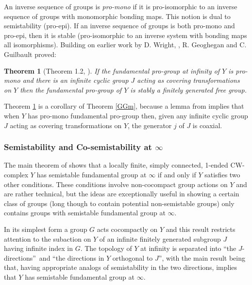 \documentclass[12pt]{article}
\newtheorem{theorem}{Theorem}[subsection]
\begin{document}
An inverse sequence of groups is {\it pro-mono} if it is pro-isomorphic to an inverse sequence of groups with monomorphic bonding maps. This notion is dual to semistability (pro-epi).  If an inverse sequence of groups is both pro-mono and pro-epi, then it is stable (pro-isomorphic to an inverse system with bonding maps all isomorphisms). 
Building on earlier work by D. Wright, \cite{W92}, R. Geoghegan and C. Guilbault \cite{GG12} proved:

\begin{theorem} [Theorem 1.2, \cite{GG12}] \label{Gg12} 
If the fundamental pro-group at infinity of $Y$ is pro-mono and there is an infinite cyclic group $J$ acting as covering transformations on $Y$ then the fundamental pro-group of $Y$ is stably a finitely generated free group.
\end{theorem}

Theorem \ref{Gg12} is a corollary of Theorem \ref{GGm}, because a lemma from \cite{W92} implies that when $Y$ has pro-mono fundamental pro-group then, given any infinite cyclic group $J$ acting as covering transformations on $Y$, the generator $j$ of $J$ is coaxial. 


\subsubsection {Semistability and Co-semistability at $\infty$}\label{SCS} 

The main theorem of \cite{GGM1} shows that a locally finite, simply connected, 1-ended  CW-complex $Y$ has semistable fundamental group at $\infty$ if and only if $Y$ satisfies two other conditions. These conditions involve non-cocompact group actions on $Y$ and are rather technical, but the ideas are exceptionally useful in showing a certain class of groups (long though to contain potential non-semistable groups) only contains groups with semistable fundamental group at $\infty$.

In its simplest form a group $G$ acts cocompactly on $Y$ and this result restricts attention to the subaction on $Y$ of an infinite finitely
generated subgroup $J$ having infinite index in $G$. The
topology of $Y$ at infinity is separated into 
\textquotedblleft the $J$-directions\textquotedblright\ and 
\textquotedblleft the directions in $Y$ orthogonal to $J$\textquotedblright, with the main result
being that, having
appropriate analogs of semistability in the two directions, implies that
$Y$ has semistable fundamental group at $\infty$.
\end{document}
